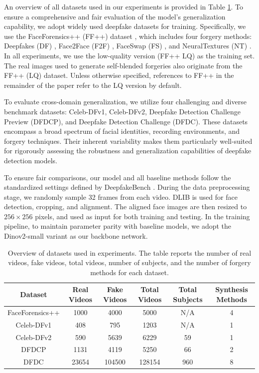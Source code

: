 \documentclass[final,5p,times]{elsarticle}
\begin{document}
An overview of all datasets used in our experiments is provided in Table \ref{tab2}. To ensure a comprehensive and fair evaluation of the model's generalization capability, we adopt widely used deepfake datasets for training. Specifically, we use the FaceForensics++ (FF++) dataset \cite{25}, which includes four forgery methods: Deepfakes (DF) \cite{34}, Face2Face (F2F) \cite{35}, FaceSwap (FS) \cite{36}, and NeuralTextures (NT) \cite{37}. In all experiments, we use the low-quality version (FF++ LQ) as the training set. The real images used to generate self-blended forgeries also originate from the FF++ (LQ) dataset. Unless otherwise specified, references to FF++ in the remainder of the paper refer to the LQ version by default.

To evaluate cross-domain generalization, we utilize four challenging and diverse benchmark datasets: Celeb-DFv1\cite{19}, Celeb-DFv2\cite{19}, Deepfake Detection Challenge Preview (DFDCP)\cite{20}, and Deepfake Detection Challenge (DFDC)\cite{21}. These datasets encompass a broad spectrum of facial identities, recording environments, and forgery techniques. Their inherent variability makes them particularly well-suited for rigorously assessing the robustness and generalization capabilities of deepfake detection models.

To ensure fair comparisons, our model and all baseline methods follow the standardized settings defined by DeepfakeBench \cite{33}. During the data preprocessing stage, we randomly sample 32 frames from each video. DLIB \cite{38} is used for face detection, cropping, and alignment. The aligned face images are then resized to $256\times256$ pixels, and used as input for both training and testing. In the training pipeline, to maintain parameter parity with baseline models, we adopt the Dinov2-small variant as our backbone network.

\begin{table}[]\rmfamily
    \centering
    \caption{Overview of datasets used in experiments. The table reports the number of real videos, fake videos, total videos, number of subjects, and the number of forgery methods for each dataset.}
    \label{tab2}
\begin{tabular}{cccccc}
\toprule
Dataset& Real Videos& Fake Videos&     Total Videos& Total Subjects&Synthesis Methods\\\midrule
                       FaceForensics++&                         1000& 4000& 5000& N/A& 4
\\ 
Celeb-DFv1& 408& 795& 1203& N/A& 1
\\
                       Celeb-DFv2& 590& 5639&                       6229& 59& 1
\\
DFDCP& 1131& 4119& 5250& 66& 2
\\
                       DFDC& 23654& 104500&                       128154& 960& 8
\\ \bottomrule
\end{tabular}
\end{table}
\end{document}
